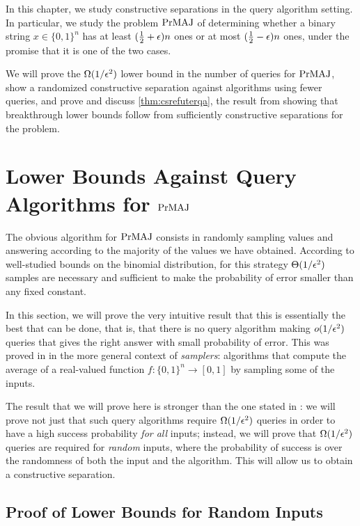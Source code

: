 In this chapter, we study constructive separations in the query algorithm setting.
In particular, we study the problem $\mathrm{PrMAJ}$ of determining whether
a binary string $x \in \{0, 1\}^n$ has at least $(\frac{1}{2}+\epsilon)n$ ones or
at most $(\frac{1}{2}-\epsilon)n$ ones, under the promise that it is one of the two
cases. 

We will prove the $\Omega(1/\epsilon^2)$ lower bound in the number of queries
for $\mathrm{PrMAJ}$, show a randomized constructive separation against algorithms
using fewer queries, and prove and discuss \cref{thm:csrefuterqa}, the result
from \cite{ConstructiveSeparations} showing that breakthrough lower
bounds follow from sufficiently constructive separations for the problem.  


\section{Lower Bounds Against Query Algorithms for $\mathrm{PrMAJ}$}
\label{sec:lbqa}

The obvious algorithm for $\mathrm{PrMAJ}$ consists in randomly sampling values and answering 
according to the majority of the values we have obtained. According to well-studied
bounds on the binomial distribution, for this strategy $\Theta(1/\epsilon^2)$ samples
are necessary and sufficient to make the probability of error smaller than any 
fixed constant.

In this section, we will prove the very intuitive result that this is essentially
the best that can be done, that is, that there is no query algorithm making $o(1/\epsilon^2)$
queries that gives the right answer with small probability of error. This was 
proved in \cite{Canetti95} in the more general context of \emph{samplers}: algorithms
that compute the average of a real-valued function $f \colon \{0, 1\}^n \to [0, 1]$
by sampling some of the inputs. 

The result that we will prove here is stronger than the one stated in \cite{Canetti95}:
we will prove not just that such query algorithms require $\Omega(1/\epsilon^2)$ queries
in order to have a high success probability \emph{for all} inputs; instead,
we will prove that $\Omega(1/\epsilon^2)$ queries are required for \emph{random} inputs,
where the probability of success is over the randomness of both the input and the algorithm.
This will allow us to obtain a constructive separation.

\subsection{Proof of Lower Bounds for Random Inputs}



